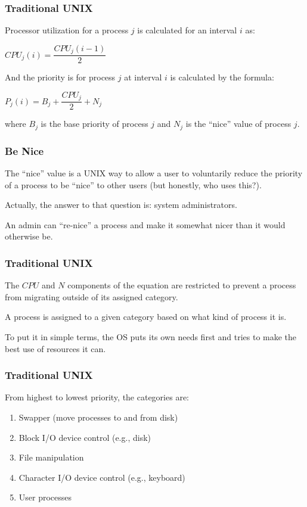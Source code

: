 \begin{frame}
\frametitle{Traditional UNIX}

Processor utilization for a process $j$ is calculated for an interval $i$ as:

\begin{center}
$CPU_{j}(i) = \dfrac{CPU_{j}(i - 1)}{2}$
\end{center}

And the priority is for process $j$ at interval $i$ is calculated by the formula:

\begin{center}
$P_{j}(i) = B_{j} + \dfrac{CPU_{j}}{2} + N_{j}$
\end{center}

where $B_{j}$ is the base priority of process $j$ and $N_{j}$ is the ``nice'' value of process $j$.


\end{frame}

\begin{frame}
\frametitle{Be Nice}

The ``nice'' value is a UNIX way to allow a user to voluntarily reduce the priority of a process to be ``nice'' to other users (but honestly, who uses this?).

Actually, the answer to that question is: system administrators. 

An admin can ``re-nice'' a process and make it somewhat nicer than it would otherwise be.


\end{frame}

\begin{frame}
\frametitle{Traditional UNIX}

The $CPU$ and $N$ components of the equation are restricted to prevent a process from migrating outside of its assigned category. 

A process is assigned to a given category based on what kind of process it is. 

To put it in simple terms, the OS puts its own needs first and tries to make the best use of resources it can.


\end{frame}

\begin{frame}
\frametitle{Traditional UNIX}

From highest to lowest priority, the categories are:

\begin{enumerate}
	\item Swapper (move processes to and from disk)
	\item Block I/O device control (e.g., disk)
	\item File manipulation
	\item Character I/O device control (e.g., keyboard)
	\item User processes
\end{enumerate}



\end{frame}

